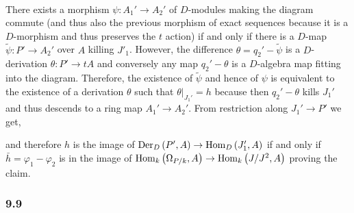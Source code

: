 \documentclass[12pt]{article}
\begin{document}
\bigskip\\
There exists a morphism $\psi : A_1' \to A_2'$ of $D$-modules making the diagram commute (and thus also the previous morphism of exact sequences because it is a $D$-morphism and thus preserves the $t$ action) if and only if there is a $D$-map $\tilde{\psi} : P' \to A_2'$ over $A$ killing $J'_1$. However, the difference $\theta = q_2' - \tilde{\psi}$ is a $D$-derivation $\theta : P' \to t A$ and conversely any map $q_2' - \theta$ is a $D$-algebra map fitting into the diagram. Therefore, the existence of $\tilde{\psi}$ and hence of $\psi$ is equivalent to the existence of a derivation $\theta$ such that $\theta|_{J_1'} = h$ because then $q_2' - \theta$ kills $J_1'$ and thus descends to a ring map $A_1' \to A_2'$. From restriction along $J_1' \to P'$ we get,
\begin{center}
\end{center}
and therefore $h$ is the image of $\Der[D]{P'}{A} \to \Hom{D}{J_1'}{A}$ if and only if $\bar{h} = \varphi_1 - \varphi_2$ is in the image of $\Hom{k}{\Omega_{P/k}}{A} \to \Hom{k}{J/J^2}{A}$ proving the claim.

\subsubsection{9.9}
\end{document}
